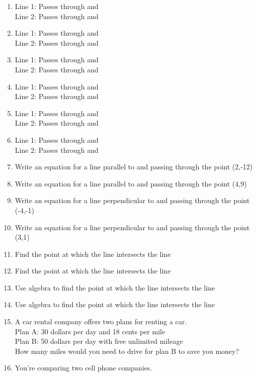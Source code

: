 \begin{enumerate}
\begin{enumerate}
\def\labelenumi{\arabic{enumi}.}
\setcounter{enumi}{34}
\item
  Line 1: Passes through and\\
  Line 2: Passes through and
\item
  Line 1: Passes through and\\
  Line 2: Passes through and
\item
  Line 1: Passes through and\\
  Line 2: Passes through and
\item
  Line 1: Passes through and\\
  Line 2: Passes through and
\item
  Line 1: Passes through and\\
  Line 2: Passes through and
\item
  Line 1: Passes through and\\
  Line 2: Passes through and
\item
  Write an equation for a line parallel to and passing through the point
  (2,-12)
\item
  Write an equation for a line parallel to and passing through the point
  (4,9)\\
  \hspace*{0.333em}
\item
  Write an equation for a line perpendicular to and passing through the
  point (-4,-1)
\item
  Write an equation for a line perpendicular to and passing through the
  point (3,1)
\item
  Find the point at which the line intersects the line
\item
  Find the point at which the line intersects the line
\item
  Use algebra to find the point at which the line intersects the line
\item
  Use algebra to find the point at which the line intersects the line\\
  \hspace*{0.333em}
\item
  A car rental company offers two plans for renting a car.\\
  Plan A: 30 dollars per day and 18 cents per mile\\
  Plan B: 50 dollars per day with free unlimited mileage\\
  How many miles would you need to drive for plan B to save you money?
\item
  You're comparing two cell phone companies.


\end{enumerate}
\end{enumerate}

